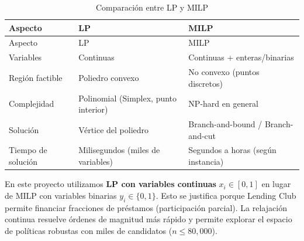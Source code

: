 \documentclass[
  spanish,
  11pt,
  letterpaper,
]{scrbook}
\theoremstyle{plain}
\theoremstyle{remark}
\begin{document}
\begin{longtable}[]{@{}
  >{\raggedright\arraybackslash}p{}
  >{\raggedright\arraybackslash}p{}
  >{\raggedright\arraybackslash}p{}@{}}
\caption{Comparación entre LP y
MILP}\label{tbl-lp-vs-milp}\tabularnewline
\toprule\noalign{}
\begin{minipage}[b]{\linewidth}\raggedright
Aspecto
\end{minipage} & \begin{minipage}[b]{\linewidth}\raggedright
LP
\end{minipage} & \begin{minipage}[b]{\linewidth}\raggedright
MILP
\end{minipage} \\
\midrule\noalign{}
\endfirsthead
\toprule\noalign{}
\begin{minipage}[b]{\linewidth}\raggedright
Aspecto
\end{minipage} & \begin{minipage}[b]{\linewidth}\raggedright
LP
\end{minipage} & \begin{minipage}[b]{\linewidth}\raggedright
MILP
\end{minipage} \\
\midrule\noalign{}
\endhead
\bottomrule\noalign{}
\endlastfoot
Variables & Continuas & Continuas + enteras/binarias \\
Región factible & Poliedro convexo & No convexo (puntos discretos) \\
Complejidad & Polinomial (Simplex, punto interior) & NP-hard en
general \\
Solución & Vértice del poliedro & Branch-and-bound / Branch-and-cut \\
Tiempo de solución & Milisegundos (miles de variables) & Segundos a
horas (según instancia) \\
\end{longtable}

\begin{tcolorbox}[enhanced jigsaw, arc=.35mm, bottomrule=.15mm, bottomtitle=1mm, breakable, colback=white, colbacktitle=quarto-callout-tip-color!10!white, colframe=quarto-callout-tip-color-frame, coltitle=black, left=2mm, leftrule=.75mm, opacityback=0, opacitybacktitle=0.6, rightrule=.15mm, title=\textcolor{quarto-callout-tip-color}{\faLightbulb}\hspace{0.5em}{Decisión de diseño: LP vs MILP}, titlerule=0mm, toprule=.15mm, toptitle=1mm]

En este proyecto utilizamos \textbf{LP con variables continuas}
\(x_i \in [0,1]\) en lugar de MILP con variables binarias
\(y_i \in \{0,1\}\). Esto se justifica porque Lending Club permite
financiar fracciones de préstamos (participación parcial). La relajación
continua resuelve órdenes de magnitud más rápido y permite explorar el
espacio de políticas robustas con miles de candidatos
(\(n \leq 80{,}000\)).

\end{tcolorbox}
\end{document}
